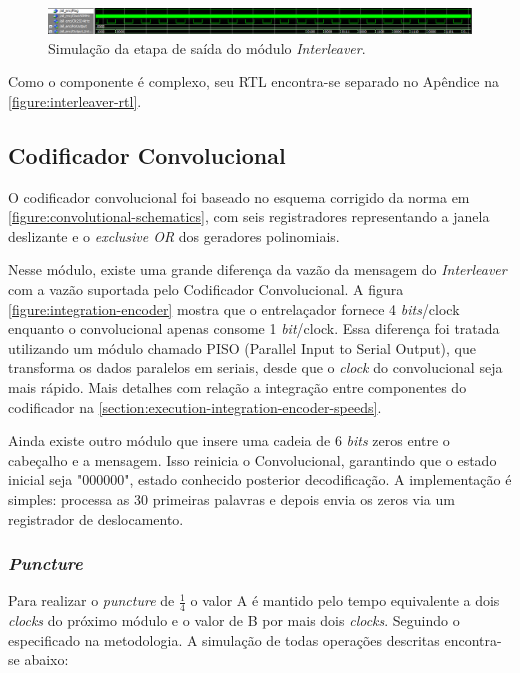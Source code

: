 	\begin{figure}[h]
		\caption{\label{figure:interleaver-simulation-flush}Simulação da etapa de saída do módulo \textit{Interleaver}.}
		\centering
		\includegraphics[width=1\textwidth]{interleaver/simulation-flush.png}
	\end{figure}

	Como o componente é complexo, seu RTL encontra-se separado no Apêndice na \autoref{figure:interleaver-rtl}.

	\subsection{Codificador Convolucional}

	O codificador convolucional foi baseado no esquema corrigido da norma em \autoref{figure:convolutional-schematics}, com seis registradores representando a janela deslizante e o \textit{exclusive OR} dos geradores polinomiais.

	Nesse módulo, existe uma grande diferença da vazão da mensagem do \textit{Interleaver} com a vazão suportada pelo Codificador Convolucional. A figura \autoref{figure:integration-encoder} mostra que o entrelaçador fornece 4 \textit{bits}/clock enquanto o convolucional apenas consome 1 \textit{bit}/clock. Essa diferença foi tratada utilizando um módulo chamado PISO (Parallel Input to Serial Output), que transforma os dados paralelos em seriais, desde que o \textit{clock} do convolucional seja mais rápido. Mais detalhes com relação a integração entre componentes do codificador na \autoref{section:execution-integration-encoder-speeds}.

	Ainda existe outro módulo que insere uma cadeia de 6 \textit{bits} zeros entre o cabeçalho e a mensagem. Isso reinicia o Convolucional, garantindo que o estado inicial seja "000000", estado conhecido posterior decodificação. A implementação é simples: processa as 30 primeiras palavras e depois envia os zeros via um registrador de deslocamento.

	\subsubsection{\textit{Puncture}}

	Para realizar o \textit{puncture} de $\frac{1}{4}$ o valor A é mantido pelo tempo equivalente a dois \textit{clocks} do próximo módulo e o valor de B por mais dois \textit{clocks}. Seguindo o especificado na metodologia. A simulação de todas operações descritas encontra-se abaixo:

